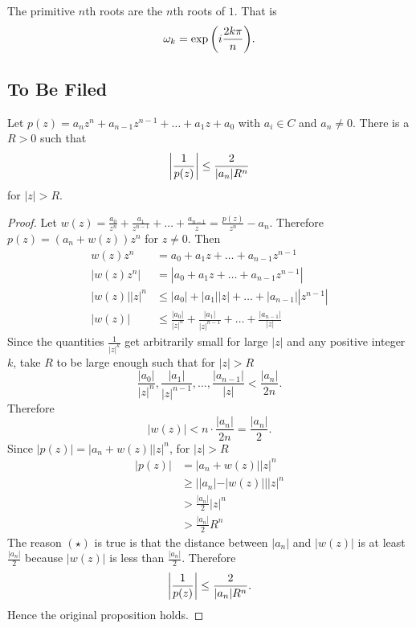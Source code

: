 \documentclass[../notes.tex]{subfiles}
\begin{document}
\begin{definition}
    The primitive $n$th roots are the $n$th roots of $1$. That is
    \[
        \omega_k = \exp\qty(i \frac{2 k \pi}{n})
    .\]
\end{definition}

\newpage
\subsection{To Be Filed}

\begin{theorem}
    Let $p(z) = a_n z^n + a_{n-1} z^{n-1} + \ldots + a_1 z + a_0$ with $a_i \in C$ and $a_n \neq 0$. There is a $R > 0$ such that
    \[
        \qty|\frac{1}{p(z)}| \leq \frac{2}{|a_n| R^n}
    \]
    for $|z| > R$.
\end{theorem}
\begin{proof}
    Let $w(z) = \frac{a_0}{z^n} + \frac{a_1}{z^{n-1}} + \ldots + \frac{a_{n-1}}{z} = \frac{p(z)}{z^n} - a_n$. Therefore $p(z) = (a_n + w(z)) z^n$ for $z \neq 0$. Then
    \begin{align*}
        w(z) z^n &= a_0 + a_1 z + \ldots + a_{n-1} z^{n-1} \\
        |w(z) z^n| &= |a_0 + a_1 z + \ldots + a_{n-1} z^{n-1}| \\
        |w(z)| |z|^n &\leq |a_0| + |a_1||z| + \ldots + |a_{n-1}| |z^{n-1}| \\
        |w(z)| &\leq \frac{|a_0|}{|z|^n} + \frac{|a_1|}{|z|^{n-1}} + \ldots + \frac{|a_{n-1}|}{|z|}
    \end{align*}
    Since the quantities $\frac{1}{|z|^k}$ get arbitrarily small for large $|z|$ and any positive integer $k$, take $R$ to be large enough such that for $|z| > R$
    \[
        \frac{|a_0|}{|z|^n}, \frac{|a_1|}{|z|^{n-1}}, \ldots, \frac{|a_{n-1}|}{|z|} < \frac{|a_n|}{2n} \tag{Not a sum}
    .\]
    Therefore 
    \[
        |w(z)| < n \cdot \frac{|a_n|}{2n} = \frac{|a_n|}{2}
    .\]
    Since $|p(z)| = |a_n + w(z)||z|^n$, for $|z| > R$
    \begin{align*}
        |p(z)| &= |a_n + w(z)||z|^n \\
               &\geq ||a_n| - |w(z)|| |z|^n \\
               &> \frac{|a_n|}{2} |z|^n \tag{$\star$} \\
               &> \frac{|a_n|}{2} R^n
    \end{align*}
    The reason $(\star)$ is true is that the distance between $|a_n|$ and $|w(z)|$ is at least $\frac{|a_n|}{2}$ because $|w(z)|$ is less than $\frac{|a_n|}{2}$. Therefore
    \[
        \qty|\frac{1}{p(z)}| \leq \frac{2}{|a_n| R^n}
    .\]
    Hence the original proposition holds.
\end{proof}
\end{document}

